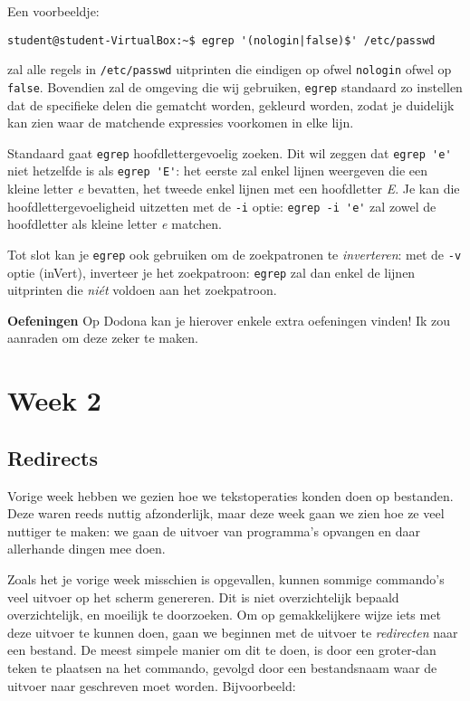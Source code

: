 \documentclass[a4paper,twoside,openany]{memoir}
\begin{document}
Een voorbeeldje:

\begin{verbatim}
student@student-VirtualBox:~$ egrep '(nologin|false)$' /etc/passwd
\end{verbatim}

zal alle regels in \verb!/etc/passwd! uitprinten die eindigen op ofwel
\verb!nologin! ofwel op \verb!false!. Bovendien zal de omgeving die wij
gebruiken, \verb!egrep! standaard zo instellen dat de specifieke delen die
gematcht worden, gekleurd worden, zodat je duidelijk kan zien waar de matchende
expressies voorkomen in elke lijn.

Standaard gaat \verb!egrep! hoofdlettergevoelig zoeken. Dit wil zeggen dat \verb!egrep 'e'! niet hetzelfde is als \verb!egrep 'E'!: het eerste zal enkel lijnen weergeven die een kleine letter \emph{e} bevatten, het tweede enkel lijnen met een hoofdletter \emph{E}. Je kan die hoofdlettergevoeligheid uitzetten met de \verb!-i! optie: \verb!egrep -i 'e'! zal zowel de hoofdletter als kleine letter \emph{e} matchen.

Tot slot kan je \verb!egrep! ook gebruiken om de zoekpatronen te \emph{inverteren}: met de \verb!-v! optie (inVert), inverteer je het zoekpatroon: \verb!egrep! zal dan enkel de lijnen uitprinten die \emph{ni\'et} voldoen aan het zoekpatroon.

\textbf{Oefeningen} Op Dodona kan je hierover enkele extra oefeningen vinden! Ik zou aanraden om deze zeker te maken.

\part{Week 2}

\chapter{Redirects}

Vorige week hebben we gezien hoe we tekstoperaties konden doen op bestanden.
Deze waren reeds nuttig afzonderlijk, maar deze week gaan we zien hoe ze veel
nuttiger te maken: we gaan de uitvoer van programma's opvangen en daar
allerhande dingen mee doen.

Zoals het je vorige week misschien is opgevallen, kunnen sommige commando's veel
uitvoer op het scherm genereren. Dit is niet overzichtelijk bepaald
overzichtelijk, en moeilijk te doorzoeken. Om op gemakkelijkere wijze iets met
deze uitvoer te kunnen doen, gaan we beginnen met de uitvoer te
\emph{redirecten} naar een bestand. De meest simpele manier om dit te doen, is
door een groter-dan teken te plaatsen na het commando, gevolgd door een
bestandsnaam waar de uitvoer naar geschreven moet worden. Bijvoorbeeld:
\end{document}
